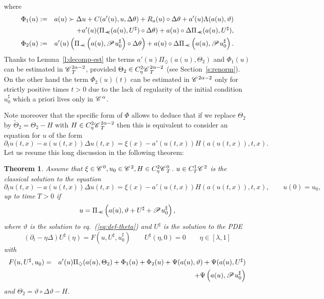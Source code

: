 \documentclass[11pt,reqno]{amsart}
\newcommand{\assign}{:=}
\newcommand{\nocomma}{}
\newcommand{\precprec}{\prec\!\!\!\prec}
\newtheorem{theorem}{Theorem}
\newcommand{\CC}{\mathscr{C} \hspace{.1em}}
\newcommand{\PP}{\mathscr{P} \hspace{.1em}}
\begin{document}
where
\begin{eqnarray*}
  \Phi_1 (u) & \assign & a (u) \succ \Delta u + C (a' (u), u, \Delta \theta) +
  R_a (u) \circ \Delta \theta + a' (u) \Lambda (a (u), \vartheta)\\
  &  & + a' (u) (\Pi_{\precprec} (a (u), U^{\sharp}) \circ \Delta \theta) + a
  (u) \circ \Delta \Pi_{\precprec} (a (u), U^{\sharp}),\\
  \Phi_2 (u) & \assign & a' (u) \left( \Pi_{\precprec} \left( a (u), \PP
  u_0^{\sharp} \right) \circ \Delta \theta \right) + a (u) \circ \Delta
  \Pi_{\precprec} \left( a (u), \PP u_0^{\sharp} \right) .
\end{eqnarray*}
Thanks to Lemma~\ref{l:decomp-est} the terms $a' (u) \Pi_{\diamondsuit} (a
(u), \Theta_2)$ and $\Phi_1 (u)$ can be estimated in $\CC^{2 \alpha - 2}_T$,
provided $\Theta_2 \in C^2_{\eta} \CC^{2 \alpha - 2}_T$ (see
Section~\ref{s:renorm}). On the other hand the term $\Phi_2 (u) (t)$ can be
estimated in $\CC^{2 \alpha - 2}$ only for strictly positive times $t > 0$ due
to the lack of regularity of the initial condition $u_0^{\sharp}$ which a
priori lives only in $\CC^{\alpha}$.

Note moreover that the specific form of $\Phi$ allows to deduce that if we
replace $\Theta_2$ by $\tilde{\Theta}_2 = \Theta_2 - H$ with $H \in C_{\eta}^2
\CC^{2 \alpha - 2}_T$ then this is equivalent to consider an equation for $u$
of the form
\[ \partial_t u (t, x) - a (u (t, x)) \Delta u (t, x) = \xi (x) - a' (u (t,
   x)) H (a (u (t, x)), t, x) . \]
Let us resume this long discussion in the following theorem:

\begin{theorem}
  \label{th:identification}Assume that $\xi \in \CC^0, u_0 \in \CC^2, H \in
  C_{\eta}^2 \CC_T^0$. $u \in C^1_T \CC^2$ is the classical solution to the
  equation
  \begin{equation}
    \partial_t u (t, x) - a (u (t, x)) \Delta u (t, x) = \xi (x) - a' (u (t,
    x)) H (a (u (t, x)), t, x), \qquad u (0) = u_0, \label{eq:pde}
  \end{equation}
  up to time $T > 0$ if
  \[ u = \Pi_{\precprec} \left( a (u), \vartheta + U^{\sharp} + \PP
     u_0^{\sharp} \right), \]
  where $\vartheta$ is the solution to eq.~(\ref{eq:def-theta}) and
  $U^{\sharp}$ is the solution to the PDE
  \begin{equation}
    (\partial_t - \eta \Delta) U^{\sharp} (\eta) = F (u, U^{\sharp},
    u_0^{\sharp}) \qquad U^{\sharp} (\eta, 0) = 0 \qquad \eta \in [\lambda, 1]
    \label{eq:pde-sharp}
  \end{equation}
  with
  \begin{eqnarray*}
    F (u, U^{\sharp}, u_0) & = & a' (u) \Pi_{\nocomma \diamondsuit} (a (u),
    \Theta_2) + \Phi_1 (u) + \Phi_2 (u) + \Psi (a (u), \vartheta) + \Psi (a
    (u), U^{\sharp})\\
    &  & + \Psi \left( a (u), \PP u_0^{\sharp} \right)
  \end{eqnarray*}
  and $\Theta_2 = \vartheta \circ \Delta \vartheta - H$.
\end{theorem}
\end{document}
